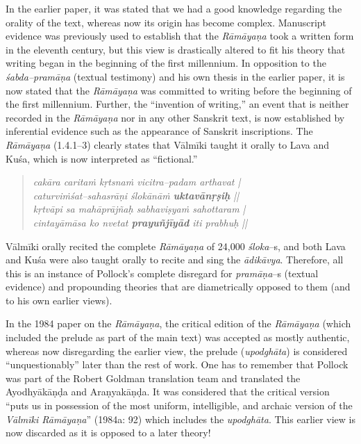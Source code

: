 In the earlier paper, it was stated that we had a good knowledge regarding the orality of the text, whereas now its origin has become complex. Manuscript evidence was previously used to establish that the \textit{Rāmāyaṇa} took a written form in the eleventh century, but this view is drastically altered to fit his theory that writing began in the beginning of the first millennium. In opposition to the \textit{śabda–pramāṇa} (textual testimony) and his own thesis in the earlier paper, it is now stated that the \textit{Rāmāyaṇa }was committed to writing before the beginning of the first millennium. Further, the “invention of writing,” an event that is neither recorded in the \textit{Rāmāyaṇa }nor in any other Sanskrit text, is now established by inferential evidence such as the appearance of Sanskrit inscriptions. The \textit{Rāmāyaṇa} (1.4.1–3) clearly states that Vālmīki taught it orally to Lava and Kuśa, which is now interpreted as “fictional.”

\begin{verse}
\textit{cakāra caritaṁ kṛtsnaṁ vicitra–padam arthavat |}\\\textit{caturviṁśat–sahasrāṇi ślokānāṁ \textbf{uktavānṛṣiḥ} ||}\\\textit{kṛtvāpi sa mahāprājñaḥ sabhaviṣyaṁ sahottaram |}\\\textit{cintayāmāsa ko nvetat \textbf{prayuñjīyād } iti prabhuḥ || }
\end{verse}

Vālmīki orally recited the complete \textit{Rāmāyaṇa} of 24,000 \textit{śloka}–s, and both Lava and Kuśa were also taught orally to recite and sing the \textit{ādikāvya}. Therefore, all this is an instance of Pollock’s complete disregard for \textit{pramāṇa}–s (textual evidence) and propounding theories that are diametrically opposed to them (and to his own earlier views).

In the 1984 paper on the \textit{Rāmāyaṇa}, the critical edition of the \textit{Rāmāyaṇa} (which included the prelude as part of the main text) was accepted as mostly authentic, whereas now disregarding the earlier view, the prelude (\textit{upodghāta}) is considered “unquestionably” later than the rest of work. One has to remember that Pollock was part of the Robert Goldman translation team and translated the Ayodhyākāṇḍa and Araṇyakāṇḍa. It was considered that the critical version “puts us in possession of the most uniform, intelligible, and archaic version of the \textit{Vālmīki Rāmāyaṇa}” (1984a: 92) which includes the \textit{upodghāta}. This earlier view is now discarded as it is opposed to a later theory!

